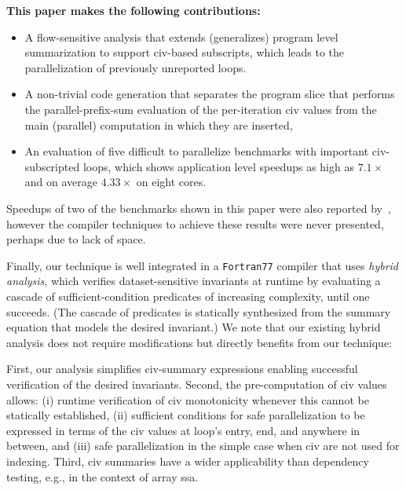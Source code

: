 \documentclass{sig-alternate}
\begin{document}
{\bf This paper makes the following contributions:}
\begin{itemize}
    \item A flow-sensitive analysis that extends (generalizes) 
            program level summarization to support {\sc civ}-based 
            subscripts, which leads to the parallelization of
            previously unreported loops.

    \item A non-trivial code generation that separates the 
            program slice that performs the parallel-prefix-sum
            evaluation of the per-iteration {\sc civ} values 
            from the main (parallel) computation in which 
            they are inserted,

    \item An evaluation of five difficult to parallelize benchmarks 
            with important {\sc civ}-subscripted loops, which
            shows application level speedups as high as 
            $7.1\times$ and on average $4.33\times$ on eight cores.
%
\end  {itemize}

Speedups of two of the benchmarks shown
in this paper were also reported by~\cite{CosPLDI}, however
the compiler techniques to achieve these results were 
never presented, perhaps due to lack of space.


Finally, our technique is well integrated %
in a {\tt Fortran77} compiler that uses {\em hybrid analysis}, 
which verifies dataset-sensitive invariants %
at runtime by evaluating a cascade of sufficient-condition 
predicates of increasing complexity, until one succeeds. 
(The cascade of predicates is statically synthesized from the summary 
equation that models the desired invariant.)
%
We note that our existing hybrid analysis does not require modifications
but directly benefits from our technique: 

First, our analysis simplifies {\sc civ}-summary expressions
enabling successful verification of the desired invariants.
Second, the pre-computation of {\sc civ} values allows:
  (i) runtime verification of {\sc civ} monotonicity whenever 
          this cannot be statically established, 
 (ii) sufficient conditions for safe parallelization to 
          be expressed in terms of the {\sc civ} values at loop's 
          entry, end, and anywhere in between, and 
(iii) safe parallelization in the simple case when
        {\sc civ} are not used for indexing.
Third, {\sc civ} summaries have a wider applicability than 
dependency testing, e.g., in the context of array {\sc ssa}.
\end{document}
